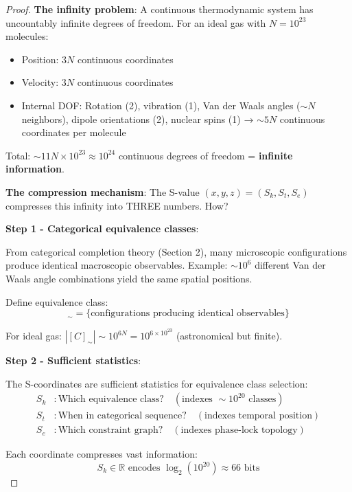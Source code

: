 \begin{proof}
\textbf{The infinity problem}: A continuous thermodynamic system has uncountably infinite degrees of freedom. For an ideal gas with $N = 10^{23}$ molecules:
\begin{itemize}
\item Position: $3N$ continuous coordinates
\item Velocity: $3N$ continuous coordinates
\item Internal DOF: Rotation (2), vibration (1), Van der Waals angles ($\sim N$ neighbors), dipole orientations (2), nuclear spins (1) → $\sim 5N$ continuous coordinates per molecule
\end{itemize}

Total: $\sim 11N \times 10^{23} \approx 10^{24}$ continuous degrees of freedom = \textbf{infinite information}.

\textbf{The compression mechanism}: The S-value $(x, y, z) = (S_k, S_t, S_e)$ compresses this infinity into THREE numbers. How?

\textbf{Step 1 - Categorical equivalence classes}:

From categorical completion theory (Section 2), many microscopic configurations produce identical macroscopic observables. Example: $\sim 10^6$ different Van der Waals angle combinations yield the same spatial positions.

Define equivalence class:
\begin{equation}
[C]_{\sim} = \{\text{configurations producing identical observables}\}
\end{equation}

For ideal gas: $|[C]_{\sim}| \sim 10^{6N} = 10^{6 \times 10^{23}}$ (astronomical but finite).

\textbf{Step 2 - Sufficient statistics}:

The S-coordinates are sufficient statistics for equivalence class selection:
\begin{align}
S_k &: \text{Which equivalence class?} \quad (\text{indexes } \sim 10^{20} \text{ classes}) \\
S_t &: \text{When in categorical sequence?} \quad (\text{indexes temporal position}) \\
S_e &: \text{Which constraint graph?} \quad (\text{indexes phase-lock topology})
\end{align}

Each coordinate compresses vast information:
\begin{equation}
S_k \in \mathbb{R} \text{ encodes } \log_2(10^{20}) \approx 66 \text{ bits}
\end{equation}


\end{proof}

